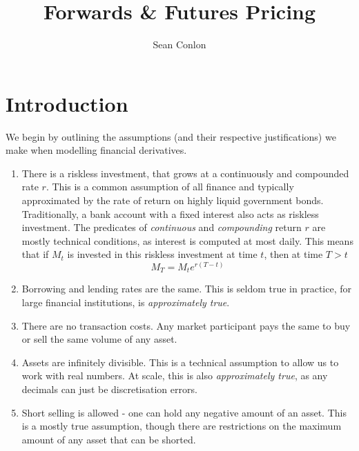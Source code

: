 \documentclass{article}
\title{Forwards \& Futures Pricing}
\author{Sean Conlon}
\begin{document}
\maketitle

\section{Introduction}
We begin by outlining the assumptions (and their respective justifications) we make when modelling financial derivatives. \begin{enumerate}
    \item There is a riskless investment, that grows at a continuously and compounded rate $r$. This is a common assumption of all finance and typically approximated by the rate of return on highly liquid government bonds. Traditionally, a bank account with a fixed interest also acts as riskless investment. The predicates of \textit{continuous} and \textit{compounding} return $r$ are mostly technical conditions, as interest is computed at most daily. This means that if $M_t$ is invested in this riskless investment at time $t$, then at time $T>t$
    $$M_T = M_t e^{r(T-t)}$$
    \item Borrowing and lending rates are the same. This is seldom true in practice, for large financial institutions, is \textit{approximately true}. 
    \item There are no transaction costs. Any market participant pays the same to buy or sell the same volume of any asset. 
    \item Assets are infinitely divisible. This is a technical assumption to allow us to work with real numbers. At scale, this is also \textit{approximately true}, as any decimals can just be discretisation errors. 
    \item Short selling is allowed - one can hold any negative amount of an asset. This is a mostly true assumption, though there are restrictions on the maximum amount of any asset that can be shorted. 
\end{enumerate} 
\end{document}
